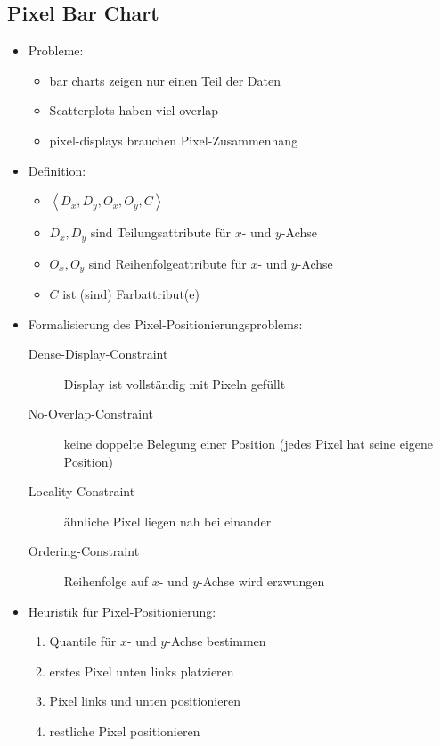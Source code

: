 \subsection{Pixel Bar Chart}
	\begin{itemize}
		\item Probleme:
			\begin{itemize}
				\item bar charts zeigen nur einen Teil der Daten
				\item Scatterplots haben viel overlap
				\item pixel-displays brauchen Pixel-Zusammenhang
			\end{itemize}
		\item Definition:
			\begin{itemize}
				\item $\left<D_x,D_y, O_x,O_y,C\right>$
				\item $D_x,D_y$ sind Teilungsattribute für $x$- und $y$-Achse
				\item $O_x,O_y$ sind Reihenfolgeattribute für $x$- und $y$-Achse
				\item $C$ ist (sind) Farbattribut(e)
			\end{itemize}
		\item Formalisierung des Pixel-Positionierungsproblems:
			\begin{description}
				\item[Dense-Display-Constraint] Display ist vollständig mit Pixeln gefüllt
				\item[No-Overlap-Constraint] keine doppelte Belegung einer Position (jedes Pixel hat seine eigene Position)
				\item[Locality-Constraint] ähnliche Pixel liegen nah bei einander
				\item[Ordering-Constraint] Reihenfolge auf $x$- und $y$-Achse wird erzwungen
			\end{description}
		\item Heuristik für Pixel-Positionierung:
			\begin{enumerate}
				\item Quantile für $x$- und $y$-Achse bestimmen
				\item erstes Pixel unten links platzieren
				\item Pixel links und unten positionieren
				\item restliche Pixel positionieren
			\end{enumerate}
	\end{itemize}
